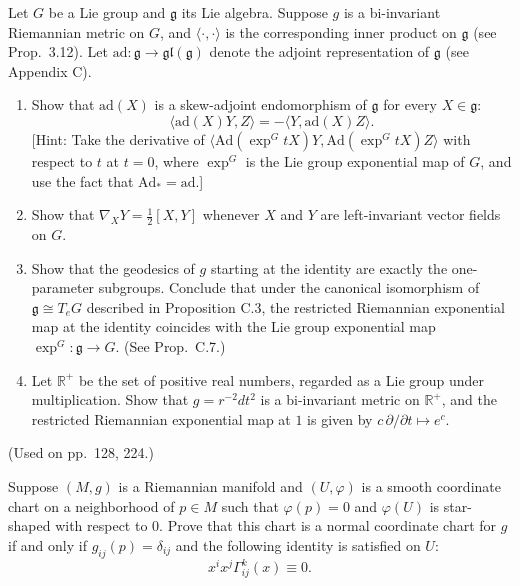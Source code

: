 \begin{exercise}
\label{prob:lie-group-bi-invariant-metric}

Let $G$ be a Lie group and $\mathfrak{g}$ its Lie algebra. Suppose $g$ is a bi-invariant Riemannian metric on $G$, and $\langle \cdot, \cdot \rangle$ is the corresponding inner product on $\mathfrak{g}$ (see Prop.\ 3.12). Let $\mathrm{ad}: \mathfrak{g} \to \mathfrak{gl}(\mathfrak{g})$ denote the adjoint representation of $\mathfrak{g}$ (see Appendix C).
\begin{enumerate}
\item[(a)] Show that $\mathrm{ad}(X)$ is a skew-adjoint endomorphism of $\mathfrak{g}$ for every $X \in \mathfrak{g}$:
\[
\langle \mathrm{ad}(X)Y, Z \rangle = -\langle Y, \mathrm{ad}(X)Z \rangle.
\]
[Hint: Take the derivative of $\langle \mathrm{Ad}(\exp^G tX)Y, \mathrm{Ad}(\exp^G tX)Z \rangle$ with respect to $t$ at $t = 0$, where $\exp^G$ is the Lie group exponential map of $G$, and use the fact that $\mathrm{Ad}_* = \mathrm{ad}$.]
\item[(b)] Show that $\nabla_X Y = \frac{1}{2}[X, Y]$ whenever $X$ and $Y$ are left-invariant vector fields on $G$.
\item[(c)] Show that the geodesics of $g$ starting at the identity are exactly the one-parameter subgroups. Conclude that under the canonical isomorphism of $\mathfrak{g} \cong T_e G$ described in Proposition C.3, the restricted Riemannian exponential map at the identity coincides with the Lie group exponential map $\exp^G : \mathfrak{g} \to G$. (See Prop.\ C.7.)
\item[(d)] Let $\mathbb{R}^+$ be the set of positive real numbers, regarded as a Lie group under multiplication. Show that $g = r^{-2} dt^2$ is a bi-invariant metric on $\mathbb{R}^+$, and the restricted Riemannian exponential map at $1$ is given by $c\,\partial/\partial t \mapsto e^c$.
\end{enumerate}
(Used on pp.\ 128, 224.)
\end{exercise}

\begin{exercise}
\label{prob:normal-coordinates-chart}

Suppose $(M, g)$ is a Riemannian manifold and $(U, \varphi)$ is a smooth coordinate chart on a neighborhood of $p \in M$ such that $\varphi(p) = 0$ and $\varphi(U)$ is star-shaped with respect to $0$. Prove that this chart is a normal coordinate chart for $g$ if and only if $g_{ij}(p) = \delta_{ij}$ and the following identity is satisfied on $U$:
\[
x^i x^j \Gamma^k_{ij}(x) \equiv 0.
\]
\end{exercise}

